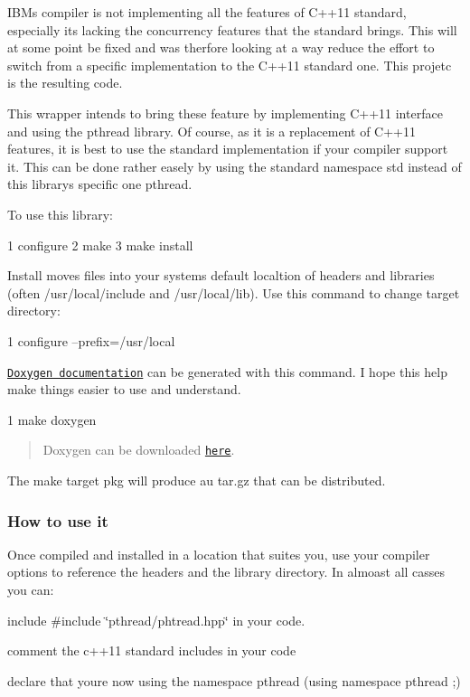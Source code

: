 I\+BM\textquotesingle{}s compiler is not implementing all the features of C++11 standard, especially it\textquotesingle{}s lacking the concurrency features that the standard brings. This will at some point be fixed and was therfore looking at a way reduce the effort to switch from a specific implementation to the C++11 standard one. This projetc is the resulting code.

This wrapper intends to bring these feature by implementing C++11 interface and using the pthread library. Of course, as it is a replacement of C++11 features, it is best to use the standard implementation if your compiler support it. This can be done rather easely by using the standard namespace {\ttfamily std} instead of this library\textquotesingle{}s specific one {\ttfamily pthread}.

To use this library\+: 
\begin{DoxyCode}
1 configure
2 make
3 make install
\end{DoxyCode}


Install moves files into your system\textquotesingle{}s default localtion of headers and libraries (often /usr/local/include and /usr/local/lib). Use this command to change target directory\+: 
\begin{DoxyCode}
1 configure --prefix=/usr/local
\end{DoxyCode}


\href{http://herbertkoelman.github.io/cpp-pthread/doc/html/}{\tt Doxygen documentation} can be generated with this command. I hope this help make things easier to use and understand. 
\begin{DoxyCode}
1 make doxygen
\end{DoxyCode}


\begin{quote}
Doxygen can be downloaded \href{http://www.stack.nl/~dimitri/doxygen/index.html}{\tt here}. \end{quote}


The {\ttfamily make} target {\ttfamily pkg} will produce au tar.\+gz that can be distributed.

\subsubsection*{How to use it}

Once compiled and installed in a location that suites you, use your compiler options to reference the headers and the library directory. In almoast all casses you can\+:
\begin{DoxyItemize}
\item include {\ttfamily \#include \char`\"{}pthread/phtread.\+hpp\char`\"{}} in your code.
\item comment the c++11 standard includes in your code
\item declare that you\textquotesingle{}re now using the namespace pthread ({\ttfamily using namespace pthread ;})
\end{DoxyItemize}

